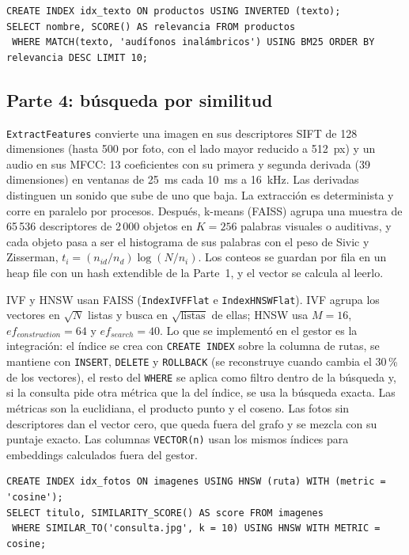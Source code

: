 \begin{lstlisting}[style=sql]
CREATE INDEX idx_texto ON productos USING INVERTED (texto);
SELECT nombre, SCORE() AS relevancia FROM productos
 WHERE MATCH(texto, 'audífonos inalámbricos') USING BM25 ORDER BY relevancia DESC LIMIT 10;
\end{lstlisting}

\subsection{Parte 4: búsqueda por similitud}

\texttt{ExtractFeatures} convierte una imagen en sus descriptores SIFT de 128 dimensiones
(hasta 500 por foto, con el lado mayor reducido a 512~px) y un audio en sus MFCC: 13
coeficientes con su primera y segunda derivada (39 dimensiones) en ventanas de 25~ms cada
10~ms a 16~kHz. Las derivadas distinguen un sonido que sube de uno que baja. La extracción
es determinista y corre en paralelo por procesos. Después, k-means (FAISS) agrupa una
muestra de 65\,536 descriptores de 2\,000 objetos en $K = 256$ palabras visuales o
auditivas, y cada objeto pasa a ser el histograma de sus palabras con el peso de Sivic y
Zisserman, $t_i = (n_{id}/n_d)\log(N/n_i)$. Los conteos se guardan por fila en un heap file
con un hash extendible de la Parte~1, y el vector se calcula al leerlo.

IVF y HNSW usan FAISS (\texttt{IndexIVFFlat} e \texttt{IndexHNSWFlat}). IVF agrupa los
vectores en $\sqrt{N}$ listas y busca en $\sqrt{\text{listas}}$ de ellas; HNSW usa $M = 16$,
$ef_{construction} = 64$ y $ef_{search} = 40$. Lo que se implementó en el gestor es la
integración: el índice se crea con \texttt{CREATE INDEX} sobre la columna de rutas, se
mantiene con \texttt{INSERT}, \texttt{DELETE} y \texttt{ROLLBACK} (se reconstruye cuando
cambia el 30\,\% de los vectores), el resto del \texttt{WHERE} se aplica como filtro dentro de la búsqueda y,
si la consulta pide otra métrica que la del índice, se usa la búsqueda exacta. Las métricas
son la euclidiana, el producto punto y el coseno. Las fotos sin descriptores dan el vector
cero, que queda fuera del grafo y se mezcla con su puntaje exacto. Las columnas
\texttt{VECTOR(n)} usan los mismos índices para embeddings calculados fuera del gestor.

\begin{lstlisting}[style=sql]
CREATE INDEX idx_fotos ON imagenes USING HNSW (ruta) WITH (metric = 'cosine');
SELECT titulo, SIMILARITY_SCORE() AS score FROM imagenes
 WHERE SIMILAR_TO('consulta.jpg', k = 10) USING HNSW WITH METRIC = cosine;
\end{lstlisting}


